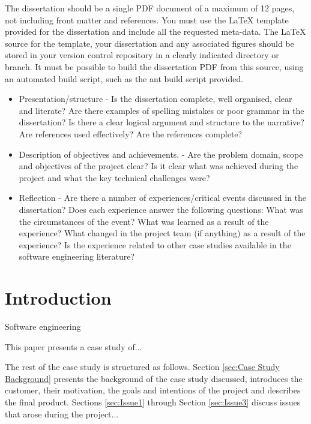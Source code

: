 \documentclass{l3proj}
\begin{document}
The dissertation should be a single PDF document of a maximum of 12 pages, not including front matter and references. You must use the LaTeX template provided for the dissertation and include all the requested meta-data. The LaTeX source for the template, your dissertation and any associated figures should be stored in your version control repository in a clearly indicated directory or branch. It must be possible to build the dissertation PDF from this source, using an automated build script, such as the ant build script provided.

\begin{itemize}
\item Presentation/structure -  	Is the dissertation complete, well organised, clear and literate? Are there examples of spelling mistakes or poor grammar in the dissertation? Is there a clear logical argument and structure to the narrative? Are references used effectively? Are the references complete?
\item Description of objectives and achievements. - Are the problem domain, scope and objectives of the project clear? Is it clear what was achieved during the project and what the key technical challenges were?
\item Reflection -  	Are there a number of experiences/critical events discussed in the dissertation? Does each experience answer the following questions: What was the circumstances of the event? What was learned as a result of the experience? What changed in the project team (if anything) as a result of the experience? Is the experience related to other case studies available in the software engineering literature?
\end{itemize}

\section{Introduction}



Software engineering 

This paper presents a case study of... 

The rest of the case study is structured as follows.  Section
\ref{sec:Case Study Background} presents the background of the case study discussed, introduces the customer, their motivation, the goals and intentions of the project and describes the final product. Sections
\ref{sec:Issue1} through Section \ref{sec:Issue3} discuss issues that
arose during the project...
\end{document}
